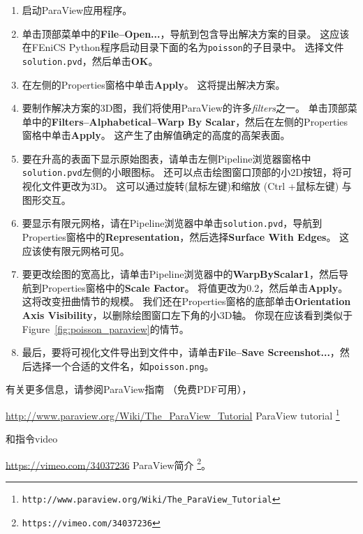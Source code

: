 \begin{enumerate}
\item 启动ParaView应用程序。

\item 单击顶部菜单中的\textbf{File--Open...}，导航到包含导出解决方案的目录。 这应该在FEniCS Python程序启动目录下面的名为\texttt{poisson}的子目录中。 选择文件\texttt{solution.pvd}，然后单击\textbf{OK}。

\item 在左侧的Properties窗格中单击\textbf{Apply}。 这将提出解决方案。

\item 要制作解决方案的3D图，我们将使用ParaView的许多\emph{filters}之一。 单击顶部菜单中的\textbf{Filters--Alphabetical--Warp By Scalar}，然后在左侧的Properties窗格中单击\textbf{Apply}。 这产生了由解值确定的高度的高架表面。

\item 要在升高的表面下显示原始图表，请单击左侧Pipeline浏览器窗格中\texttt{solution.pvd}左侧的小眼图标。 还可以点击绘图窗口顶部的小2D按钮，将可视化文件更改为3D。 这可以通过旋转(鼠标左键)和缩放 (Ctrl +鼠标左键) 与图形交互。

\item 要显示有限元网格，请在Pipeline浏览器中单击\texttt{solution.pvd}，导航到Properties窗格中的\textbf{Representation}，然后选择\textbf{Surface With Edges}。 这应该使有限元网格可见。

\item 要更改绘图的宽高比，请单击Pipeline浏览器中的\textbf{WarpByScalar1}，然后导航到Properties窗格中的\textbf{Scale Factor}。 将值更改为0.2，然后单击\textbf{Apply}。 这将改变扭曲情节的规模。 我们还在Properties窗格的底部单击\textbf{Orientation Axis Visibility}，以删除绘图窗口左下角的小3D轴。 你现在应该看到类似于Figure~\ref{fig:poisson_paraview}的情节。

\item 最后，要将可视化文件导出到文件中，请单击\textbf{File--Save Screenshot...}，然后选择一个合适的文件名，如\texttt{poisson.png}。
\end{enumerate}

\noindent
有关更多信息，请参阅ParaView指南\cite{Paraview}
（免费PDF可用），
\begin{center}
  \url{http://www.paraview.org/Wiki/The_ParaView_Tutorial} {ParaView tutorial} \footnote{\texttt{http://www.paraview.org/Wiki/The\_ParaView\_Tutorial}}
\end{center}
  和指令video
\begin{center}
  \url{https://vimeo.com/34037236} {ParaView简介} \footnote{\texttt{https://vimeo.com/34037236}}。
\end{center}


